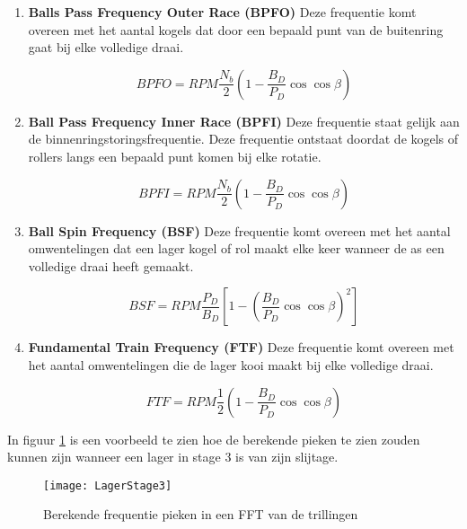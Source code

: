 \begin{enumerate}
	\item \textbf{Balls Pass Frequency Outer Race (\gls{BPFO})} Deze frequentie komt overeen met het aantal kogels dat door een bepaald punt van de buitenring gaat bij elke volledige draai.
	
	\begin{equation}
		BPFO = RPM\frac{N_b}{2}(1-\frac{B_D}{P_D}\cos\cos\beta)
	\end{equation}
	\newpage
	
	\item \textbf{Ball Pass Frequency Inner Race (\gls{BPFI})} Deze frequentie staat gelijk aan de binnenringstoringsfrequentie. Deze frequentie ontstaat doordat de kogels of rollers langs een bepaald punt komen bij elke rotatie.
	
	\begin{equation}
		BPFI = RPM\frac{N_b}{2}(1-\frac{B_D}{P_D}\cos \cos \beta)
	\end{equation}
	
	\item \textbf{Ball Spin Frequency (\gls{BSF})} Deze frequentie komt overeen met het aantal omwentelingen dat een lager kogel of rol maakt elke keer wanneer de as een volledige draai heeft gemaakt.
	
	\begin{equation}
		BSF = RPM\frac{P_D}{B_D}[1-(\frac{B_D}{P_D} \cos \cos \beta)^2]
	\end{equation}
	
	\item \textbf{Fundamental Train Frequency (\gls{FTF})} Deze frequentie komt overeen met het aantal omwentelingen die de lager kooi maakt bij elke volledige draai.
	
	\begin{equation}
		FTF=RPM\frac{1}{2}(1-\frac{B_D}{P_D} \cos \cos \beta)
	\end{equation}
\end{enumerate}

In figuur \ref{fig:LagerStage3} is een voorbeeld te zien hoe de berekende pieken te zien zouden kunnen zijn wanneer een lager in stage 3 is van zijn slijtage.

\begin{figure}[h]
	\centering
	
	\texttt{[image: LagerStage3]}
	
	\label{fig:LagerStage3}
	\caption{Berekende frequentie pieken in een \gls{FFT} van de trillingen \cite{web:BearingFault}}
\end{figure}

